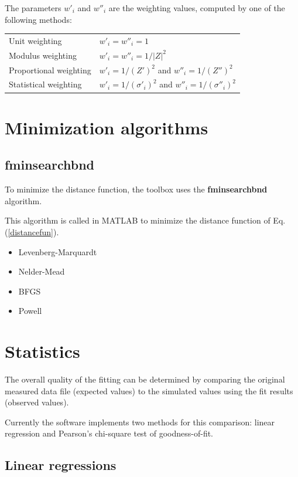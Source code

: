 \documentclass[10pt,a4paper,oneside]{book}
\begin{document}
The parameters $w'_i$ and $w''_i$ are the weighting values, computed by one of the following methods:

\begin{tabular}{ll}
	Unit weighting 			& $w'_i = w''_i = 1$ \\
	Modulus weighting 		& $w'_i = w''_i = 1/|Z|^2$ \\
	Proportional weighting 	& $w'_i = 1/(Z')^2$ and $w''_i = 1/(Z'')^2$ \\
	Statistical weighting 	& $w'_i = 1/(\sigma'_i)^2$ and $w''_i = 1/(\sigma''_i)^2$ \\
\end{tabular}


\newpage
\section{Minimization algorithms}

\subsection{fminsearchbnd}

To minimize the distance function, the toolbox uses the \textbf{fminsearchbnd} algorithm.

This algorithm is called in MATLAB to minimize the distance function of Eq. (\ref{distancefun}).

\begin{itemize}
	\item Levenberg-Marquardt
	\item Nelder-Mead
	\item BFGS
    \item Powell
\end{itemize}


\newpage
\section{Statistics}

The overall quality of the fitting can be determined by comparing the original measured data file (expected values) to the simulated values using the fit results (observed values).

Currently the software implements two methods for this comparison: linear regression and Pearson's chi-square test of goodness-of-fit.

\subsection{Linear regressions}
\end{document}
